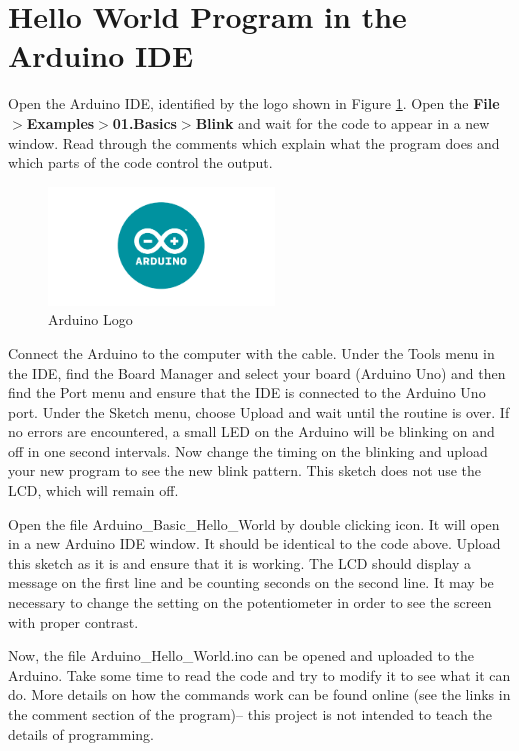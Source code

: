 \documentclass[]{article}
\begin{document}
\section{Hello World Program in the Arduino IDE}

Open the Arduino IDE, identified by the logo shown in Figure \ref{arduino}.  Open the \textbf{ File$>$Examples$>$01.Basics$>$Blink} and wait for the code to appear in a new window.  Read through the comments which explain what the program does and which parts of the code control the output.


\begin{figure}[h]
	\centering
	\includegraphics[width=6cm]{pics/arduino-ide.png}
	\caption{Arduino Logo}
	\label{arduino}
\end{figure}

Connect the Arduino to the computer with the cable.  Under the Tools menu in the IDE, find the Board Manager and select your board (Arduino Uno) and then find the Port menu and ensure that the IDE is connected to the Arduino Uno port.  Under the Sketch menu, choose Upload and wait until the routine is over.  If no errors are encountered, a small LED on the Arduino will be blinking on and off in one second intervals.  Now change the timing on the blinking and upload your new program to see the new blink pattern.  This sketch does not use the LCD, which will remain off.

Open the file 
Arduino\_Basic\_Hello\_World by double clicking icon.  It will open in a new Arduino IDE window.  It should be identical to the code above. Upload this sketch as it is and ensure that it is working.  The LCD should display a message on the first line and be counting seconds on the second line.  It may be necessary to change the setting on the potentiometer in order to see the screen with proper contrast.  

Now, the file Arduino\_Hello\_World.ino can be opened and uploaded to the Arduino.  Take some time to read the code and try to modify it to see what it can do.  More details on how the commands work can be found online (see the links in the comment section of the program)-- this project is not intended to teach the details of programming.  
\end{document}
